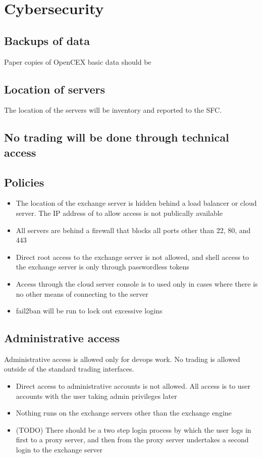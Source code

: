 \section{Cybersecurity}

\subsection{Backups of data}
Paper copies of OpenCEX basic data should be    

\subsection{Location of servers}
The location of the servers will be inventory and reported to the SFC.

\subsection{No trading will be done through technical access}

\subsection{Policies}
\begin{itemize}
  \item The location of the exchange server is hidden behind a load
  balancer or cloud server.  The IP address of to allow access is not
  publically available
  \item All servers are behind a firewall that blocks all ports other
    than 22, 80, and 443
  \item Direct root access to the exchange server is not allowed, and
    shell access to the exchange server is only through passwordless
    tokens
  \item Access through the cloud server console is to used only in
    cases where there is no other means of connecting to the server
  \item fail2ban will be run to lock out excessive logins 
\end{itemize}
\subsection{Administrative access}
Administrative access is allowed only for devops work.  No trading is
allowed outside of the standard trading interfaces.

\begin{itemize}
\item Direct access to administrative accounts is not allowed.  All
  access is to user accounts with the user taking admin privileges
  later
\item Nothing runs on the exchange servers other than the exchange engine
\item (TODO) There should be a two step login process by which the
  user logs in first to a proxy server, and then from the proxy server
  undertakes a second login to the exchange server
\end{itemize}

